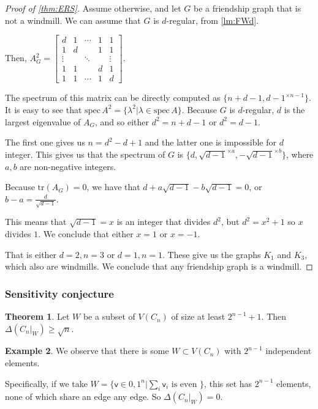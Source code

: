 \documentclass[12pt]{amsart}
\theoremstyle{definition}
\newtheorem{thm}{Theorem}[section]
\newtheorem{smpl}[thm]{Example}
\newcommand{\vv}{\mathsf{v}}
\newcommand{\tr}{\mathrm{tr}}
\newcommand{\spec}{\mathrm{spec} }
\begin{document}
\begin{proof}[Proof of \cref{thm:ERS}]
Assume otherwise, and let $G$ be a friendship graph that is not a windmill.
We can assume that $G$ is $d$-regular, from \cref{lm:FWd}.

Then, 
$A_{G}^2 = 
\begin{bmatrix}
d & 1 & \cdots & 1 & 1\\
1 & d & & 1 & 1\\
\vdots & & \ddots &  & \vdots\\
1 & 1 & & d & 1\\
1 & 1 & \cdots & 1 & d
\end{bmatrix}$.

The spectrum of this matrix can be directly computed as $\{n + d - 1, d-1^{\times n-1}\}$.
It is easy to see that $\spec \, A^2 = \{ \lambda^2 | \lambda \in \spec \, A\}$.
Because $G$ is $d$-regular, $d$ is the largest eigenvalue of $A_G$, and so either $d^2 = n+d-1$ or $d^2 = d-1$.

The first one gives us $n = d^2 - d + 1$ and the latter one is impossible for $d$ integer.
This gives us that the spectrum of $G$ is $\{d, \sqrt{d-1}^{\times a}, -\sqrt{d-1}^{\times b}\}$, where $a, b$ are non-negative integers.

Because $\tr(A_G ) = 0$, we have that $ d + a\sqrt{d-1} - b\sqrt{d-1} = 0$, or $b-a = \frac{d}{\sqrt{d-1}}$.

This means that $\sqrt{d-1} = x$ is an integer that divides $d^2$, but $d^2 = x^2 + 1$ so $x $ divides $1$.
We conclude that either $x = 1$ or $x = -1$.

That is either $d = 2, n = 3$ or $d = 1, n=1$.
These give us the graphs $K_1$ and $K_3$, which also are windmills.
We conclude that any friendship graph is a windmill.
\end{proof}

\subsubsection*{Sensitivity conjecture}

\begin{thm}\label{thm:zhang}
Let $W$ be a subset of $V(C_n)$ of size at least $2^{n-1}+1$.
Then $\Delta(C_n|_W) \geq \sqrt{n}$.
\end{thm}

\begin{smpl}
We observe that there is some $W \subset V(C_n)$ with $2^{n-1}$ independent elements.

Specifically, if we take $W = \{ \vv \in {0, 1}^n | \sum_i \vv_i \text{ is even }\}$, this set has $2^{n-1}$ elements, none of which share an edge any edge.
So $\Delta(C_n|_W) = 0$.
\end{smpl}
\end{document}
